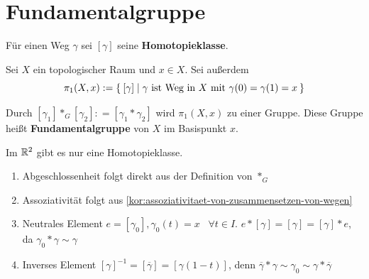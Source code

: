 \section{Fundamentalgruppe}
Für einen Weg $\gamma$ sei $[\gamma]$ seine \textbf{Homotopieklasse}.

\begin{definition}
    Sei $X$ ein topologischer Raum und $x \in X$. Sei außerdem
    \[\pi_1(X,x) := \Set{[\gamma] | \gamma \text{ ist Weg in } X \text{ mit } \gamma(0) = \gamma(1) = x}\]

    Durch $[\gamma_1] *_G [\gamma_2] : = [\gamma_1 * \gamma_2]$ wird
    $\pi_1(X,x)$ zu einer Gruppe. Diese Gruppe heißt \textbf{Fundamentalgruppe}
    von $X$ im Basispunkt $x$.
\end{definition}

\begin{bemerkung}
    Im $\mathbb{R}^2$ gibt es nur eine Homotopieklasse.
\end{bemerkung}

\begin{beweis}\leavevmode
    \begin{enumerate}[label=\alph*)]
        \item Abgeschlossenheit folgt direkt aus der Definition von $*_G$
        \item Assoziativität folgt aus \cref{kor:assoziativitaet-von-zusammensetzen-von-wegen}
        \item Neutrales Element $e = [\gamma_0], \gamma_0(t) = x \;\;\; \forall t \in I$.
              $e * [\gamma] = [\gamma] = [\gamma] * e$, da $\gamma_0 * \gamma \sim \gamma$
        \item Inverses Element  $[\gamma]^{-1} = [\overline{\gamma}] = [\gamma(1-t)]$, 
              denn $\overline{\gamma} * \gamma \sim \gamma_0 \sim \gamma * \overline{\gamma}$
    \end{enumerate}
\end{beweis}

